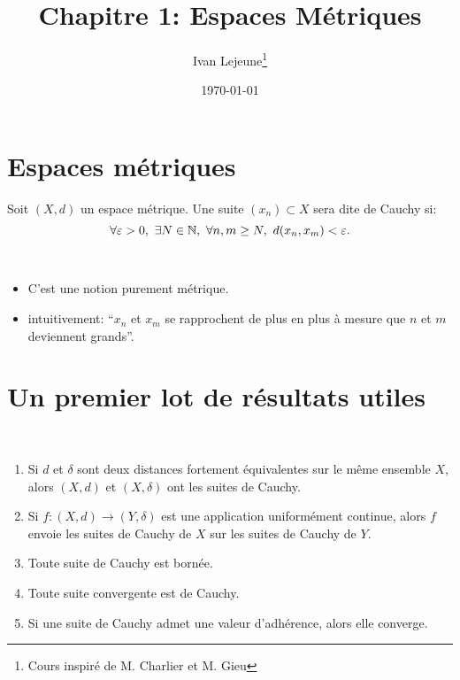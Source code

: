 \documentclass[french,a4paper,10pt]{article}
\title{\color{astral} \sffamily \bfseries Chapitre 1: Espaces Métriques}
\author{Ivan Lejeune\thanks{Cours inspiré de M. Charlier et M. Gieu}}
\date{\today}
\begin{document}
	\maketitle

	\section{Espaces métriques}
	
	\begin{definition}
        Soit $(X,d)$ un espace métrique.
        Une suite $(x_n)\subset X$ sera dite de Cauchy si:
        \[
            \forall \varepsilon>0,\ \exists N\in\bb N,\ \forall n,m\geq N,\ d(x_n,x_m)<\varepsilon.
        \]
    \end{definition}

    \begin{remark}\,
        \begin{itemize}
            \item C'est une notion purement métrique.
            \item intuitivement: ``$x_n$ et $x_m$ se rapprochent de plus en plus
            à mesure que $n$ et $m$ deviennent grands''.
        \end{itemize}
    \end{remark}

    \section{Un premier lot de résultats utiles}

    \begin{proposition}\,
        \begin{enumerate}
            \item Si $d$ et $\delta$ sont deux distances fortement équivalentes sur le même ensemble $X$,
            alors $(X,d)$ et $(X,\delta)$ ont les  suites de Cauchy.
            \item Si $f\colon (X,d)\to (Y,\delta)$ est une application uniformément continue, alors
            $f$ envoie les suites de Cauchy de $X$ sur les suites de Cauchy de $Y$.
            \item Toute suite de Cauchy est bornée.
            \item Toute suite convergente est de Cauchy.
            \item Si une suite de Cauchy admet une valeur d'adhérence, alors elle converge.
        \end{enumerate}
    \end{proposition}
\end{document}
